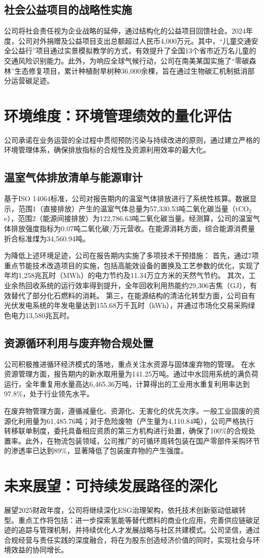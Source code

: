 \documentclass[a4paper,12pt]{article}
\begin{document}
\subsection{社会公益项目的战略性实施}
公司将社会责任视为企业战略的延伸，通过结构化的公益项目回馈社会。2024年度，公司对外捐赠及公益项目支出总额超过人民币4,000万元。其中，“儿童交通安全公益行”项目通过实景模拟教学的方式，有效提升了全国13个省市近万名儿童的交通风险识别能力。此外，为响应全球气候行动，公司在南美某国实施了“零碳森林”生态修复项目，累计种植耐旱树种36,000余棵，旨在通过生物碳汇机制抵消部分运营碳足迹。

\section{环境维度：环境管理绩效的量化评估}

公司承诺在业务运营的全过程中贯彻预防污染与持续改进的原则，通过建立严格的环境管理体系，确保排放指标的合规性及资源利用效率的最大化。

\subsection{温室气体排放清单与能源审计}
基于ISO 14064标准，公司对报告期内的温室气体排放进行了系统性核算。数据显示，范围1（直接排放）产生的温室气体总量为57,330.53吨二氧化碳当量（tCO$_2$e），范围2（能源间接排放）为122,786.63吨二氧化碳当量。经测算，公司的温室气体排放强度指标为0.07吨二氧化碳/万元营收。在能源消耗方面，综合能源消费量折合标准煤为34,560.94吨。

为降低上述环境足迹，公司在报告期内实施了多项技术干预措施：
首先，通过7项重点节能技术改造项目的实施，包括高能效设备的置换及工艺参数的优化，实现了年均1,258兆瓦时（MWh）的电力节约及11.34万立方米的天然气节约。
其次，工业余热回收系统的运行效率得到提升，全年回收利用热能约29,306吉焦（GJ），有效替代了部分化石燃料的消耗。
第三，在能源结构的清洁化转型方面，公司自有光伏发电系统的年发电量达到155.68万千瓦时（kWh），并通过市场化交易采购绿色电力13,580兆瓦时。

\subsection{资源循环利用与废弃物合规处置}
公司积极推进循环经济模式的落地，重点关注水资源与固体废弃物的管理。
在水资源管理方面，报告期内的新水取用量为141.25万吨。通过中水回用系统的满负荷运行，全年重复用水量高达6,465.36万吨，计算得出的工业用水重复利用率达到97.8\%，处于行业领先水平。

在废弃物管理方面，遵循减量化、资源化、无害化的优先次序。一般工业固废的资源化利用量为61,485.76吨；对于危险废物（产生量为4,110.84吨），公司严格执行转移联单制度，委托具备相应资质的第三方机构进行处置，确保了100\%的合规处置率。此外，在物流包装领域，公司推广的可循环周转包装在国产零部件采购环节的渗透率已达到89\%，显著降低了包装废弃物的产生强度。

\section{未来展望：可持续发展路径的深化}

展望2025财政年度，公司将继续深化ESG治理架构，依托技术创新驱动低碳转型。重点工作将包括：进一步探索氢能等替代燃料的商业化应用，完善供应链碳足迹的追踪与管理机制，并持续优化人才发展战略与社区共建模式。公司坚信，通过合规经营与责任实践的深度融合，将在为股东创造经济价值的同时，实现社会与环境效益的协同增长。

\vspace{2cm}
\end{document}
